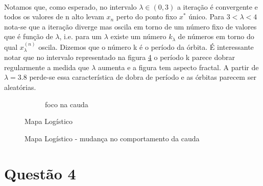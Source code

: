 \documentclass[a4paper,11pt]{article}
\begin{document}
\paragraph{}Notamos que, como esperado, no intervalo $\lambda \in (0, 3)$ a iteração é convergente e todos os valores de n alto levam $x_n$ perto do ponto fixo $x^*$ único. Para $3 < \lambda < 4 $  nota-se que a iteração diverge mas oscila em torno de um número fixo de valores que é função de $\lambda$, i.e. para um $\lambda$ existe um número $k_\lambda$ de números em torno do qual $x^{(n)}_\lambda$ oscila. Dizemos que o número k é o período da órbita. É interessante notar que no intervalo representado na figura \ref{graph:3-3} o período k parece dobrar regularmente a medida que $\lambda$ aumenta e a figura tem aspecto fractal. A partir de $\lambda = 3.8$ perde-se essa característica de dobra de período e as órbitas parecem ser aleatórias. 
\FloatBarrier
\begin{figure}[!htp]
	\begin{subfigure}[h]{\textwidth}
	\centering
	
	\caption{}
	\label{graph:3-1}
	\end{subfigure}	
	
	\begin{subfigure}[h]{\textwidth}
	\centering	
	
	\caption{foco na cauda}
	\label{graph:3-2}	
	\end{subfigure}	
	\caption{Mapa Logístico}
\end{figure}
\FloatBarrier
\FloatBarrier
\begin{figure}[!htp]
	\begin{subfigure}[h]{0.4\textwidth}
	\centering
	
	\caption{}
	\label{graph:3-3}
	\end{subfigure}	

	\begin{subfigure}[h]{\textwidth}
	\centering	
	
	\caption{}
	\label{graph:3-4}	
	\end{subfigure}	
	\caption{Mapa Logístico - mudança no comportamento da cauda}
\end{figure}
\FloatBarrier

\section*{Questão 4}
\end{document}
